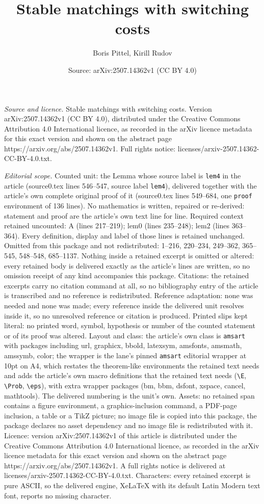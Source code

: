 \documentclass[10pt,a4paper]{amsart}
\title[Stable matchings with switching costs]{Stable matchings with switching costs}
\author{Boris Pittel, Kirill Rudov}
\date{Source: arXiv:2507.14362v1 (CC BY 4.0)}
\begin{document}
\maketitle

\noindent\emph{Source and licence.} Stable matchings with switching costs. Version arXiv:2507.14362v1 (CC BY 4.0), distributed under the Creative Commons Attribution 4.0 International licence, as recorded in the arXiv licence metadata for this exact version and shown on the abstract page https://arxiv.org/abs/2507.14362v1. Full rights notice: licenses/arxiv-2507.14362-CC-BY-4.0.txt.\par\smallskip

\noindent\textit{Editorial scope.} Counted unit: the Lemma whose source label is \texttt{lem4} in the article (source0.tex lines 546--547, source label \texttt{lem4}), delivered together with the article's own complete original proof of it (source0.tex lines 549--684, one \texttt{proof} environment of 136 lines). No mathematics is written, repaired or re-derived: statement and proof are the article's own text line for line. Required context retained uncounted: A (lines 217--219); lem0 (lines 235--248); lem2 (lines 363--364). Every definition, display and label of those lines is retained unchanged. Omitted from this package and not redistributed: 1--216, 220--234, 249--362, 365--545, 548--548, 685--1137. Nothing inside a retained excerpt is omitted or altered: every retained body is delivered exactly as the article's lines are written, so no omission receipt of any kind accompanies this package. Citations: the retained excerpts carry no citation command at all, so no bibliography entry of the article is transcribed and no reference is redistributed. Reference adaptation: none was needed and none was made; every reference inside the delivered unit resolves inside it, so no unresolved reference or citation is produced. Printed slips kept literal: no printed word, symbol, hypothesis or number of the counted statement or of its proof was altered. Layout and class: the article's own class is \texttt{amsart} with packages including url, graphicx, bbold, latexsym, amsfonts, amsmath, amssymb, color; the wrapper is the lane's pinned \texttt{amsart} editorial wrapper at 10pt on A4, which restates the theorem-like environments the retained text needs and adds the article's own macro definitions that the retained text needs (\texttt{\textbackslash E}, \texttt{\textbackslash Prob}, \texttt{\textbackslash eps}), with extra wrapper packages (bm, bbm, dsfont, xspace, cancel, mathtools). The delivered numbering is the unit's own. Assets: no retained span contains a figure environment, a graphics-inclusion command, a PDF-page inclusion, a table or a TikZ picture; no image file is copied into this package, the package declares no asset dependency and no image file is redistributed with it. Licence: version arXiv:2507.14362v1 of this article is distributed under the Creative Commons Attribution 4.0 International licence, as recorded in the arXiv licence metadata for this exact version and shown on the abstract page https://arxiv.org/abs/2507.14362v1. A full rights notice is delivered at licenses/arxiv-2507.14362-CC-BY-4.0.txt. Characters: every retained excerpt is pure ASCII, so the delivered engine, XeLaTeX with its default Latin Modern text font, reports no missing character.
\end{document}

